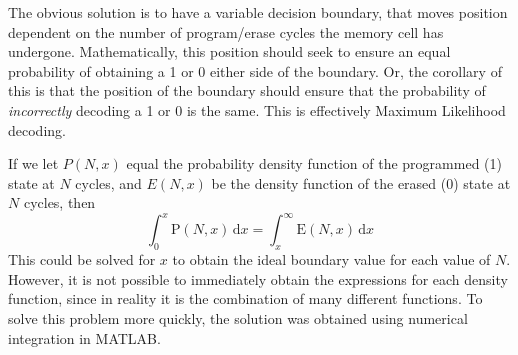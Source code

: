\documentclass[11pt]{article}
\numberwithin{equation}{subsection}
\begin{document}
The obvious solution is to have a variable decision boundary, that moves position dependent on the number of program/erase cycles the memory cell has undergone. Mathematically, this position should seek to ensure an equal probability of obtaining a 1 or 0 either side of the boundary. Or, the corollary of this is that the position of the boundary should ensure that the probability of \textit{incorrectly} decoding a 1 or 0 is the same. This is effectively Maximum Likelihood decoding.

If we let $P(N,x)$ equal the probability density function of the programmed (1) state at $N$ cycles, and $E(N,x)$ be the density function of the erased (0) state at $N$ cycles, then
\begin{equation}
\int_0^x \mathrm{P}(N,x)\,\mathrm{d}x = \int_x^\infty \mathrm{E}(N,x)\,\mathrm{d}x
\end{equation}
This could be solved for $x$ to obtain the ideal boundary value for each value of $N$. However, it is not possible to immediately obtain the expressions for each density function, since in reality it is the combination of many different functions. To solve this problem more quickly, the solution was obtained using numerical integration in MATLAB. 
\end{document}
